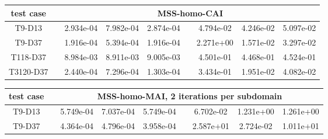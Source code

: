 \begin{table}
\begin{adjustbox}{width=1\textwidth} %
\small
\begin{tabular}{ccccccccc}
\toprule
{test case} && \multicolumn{7}{c}{MSS-homo-CAI}   \\
\midrule
T9-D13       &&  2.934e-04 &  7.982e-04 &  2.874e-04 &&  4.794e-02 &  4.246e-02 &  5.097e-02 \\
T9-D37       &&  1.916e-04 &  5.394e-04 &  1.916e-04 &&  2.271e+00 &  1.571e-02 &  3.297e-02 \\
T118-D37     &&  8.984e-03 &  8.911e-03 &  9.005e-03 &&  4.501e-01 &  4.468e-01 &  4.524e-01 \\
T3120-D37    &&  2.440e-04 &  7.296e-04 &  1.303e-04 &&  3.434e-01 &  1.951e-02 &  4.082e-02 \\
\bottomrule
\end{tabular}
\end{adjustbox}
\begin{adjustbox}{width=1\textwidth} %
\small
\begin{tabular}{ccccccccc}
\toprule
{test case} && \multicolumn{7}{c}{MSS-homo-MAI, 2 iterations per subdomain}   \\
\midrule
T9-D13       &&  5.749e-04 &  7.037e-04 &  5.749e-04 &&  6.702e-02 &  1.231e+00 &  1.261e+00 \\
T9-D37       &&  4.364e-04 &  4.796e-04 &  3.958e-04 &&  2.587e+01 &  2.724e-02 &  1.011e+01 \\

\end{tabular}
\end{adjustbox}
\end{table}
